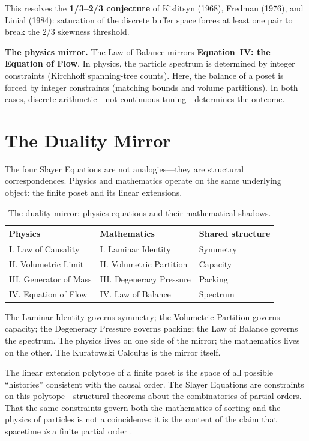 \documentclass[11pt, a4paper, openany]{book}
\newcounter{thm}[chapter]
\begin{document}
This resolves the \textbf{1/3--2/3 conjecture} of Kislitsyn (1968),
Fredman (1976), and Linial (1984): saturation of the discrete buffer
space forces at least one pair to break the $2/3$ skewness threshold.

\medskip\noindent
\textbf{The physics mirror.} The Law of Balance mirrors
\textbf{Equation~IV: the Equation of Flow}. In physics, the particle
spectrum is determined by integer constraints (Kirchhoff spanning-tree
counts). Here, the balance of a poset is forced by integer
constraints (matching bounds and volume partitions). In both cases,
discrete arithmetic---not continuous tuning---determines the outcome.

\section{The Duality Mirror}

The four Slayer Equations are not analogies---they are structural
correspondences. Physics and mathematics operate on the same
underlying object: the finite poset and its linear extensions.

\begin{table}[H]
\centering
\caption{The duality mirror: physics equations and their mathematical
shadows.}
\label{tab:duality-mirror}
\begin{tabular}{@{}lll@{}}
\toprule
\textbf{Physics} & \textbf{Mathematics} & \textbf{Shared structure} \\
\midrule
I. Law of Causality & I. Laminar Identity & Symmetry \\
II. Volumetric Limit & II. Volumetric Partition & Capacity \\
III. Generator of Mass & III. Degeneracy Pressure & Packing \\
IV. Equation of Flow & IV. Law of Balance & Spectrum \\
\bottomrule
\end{tabular}
\end{table}

\noindent
The Laminar Identity governs symmetry; the Volumetric Partition governs
capacity; the Degeneracy Pressure governs packing; the Law of Balance
governs the spectrum. The physics lives on one side of the mirror; the
mathematics lives on the other. The Kuratowski Calculus is the mirror
itself.

\begin{logicalreading}
The linear extension polytope of a finite poset is the space of all
possible ``histories'' consistent with the causal order. The Slayer
Equations are constraints on this polytope---structural theorems about
the combinatorics of partial orders. That the same constraints govern
both the mathematics of sorting and the physics of particles is not a
coincidence: it is the content of the claim that spacetime \emph{is} a
finite partial order \cite{bombelli1987,sorkin2003}.
\end{logicalreading}
\end{document}
